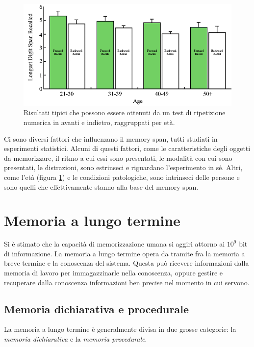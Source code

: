 \begin{figure}[hbt]
  \centering
  \includegraphics[width=\textwidth]{img/digit-span.png}
  \caption{Risultati tipici che possono essere ottenuti da un test di ripetizione numerica in avanti e indietro, raggruppati per età.}
  \label{fig:memory-span}
\end{figure}

Ci sono diversi fattori che influenzano il memory span, tutti studiati in esperimenti statistici. Alcuni di questi fattori, come le caratteristiche degli oggetti da memorizzare, il ritmo a cui essi sono presentati, le modalità con cui sono presentati, le distrazioni, sono estrinseci e riguardano l'esperimento in sé. Altri, come l'età (figura \ref{fig:memory-span}) e le condizioni patologiche, sono intrinseci delle persone e sono quelli che effettivamente stanno alla base del memory span.

\section{Memoria a lungo termine}
Si è stimato che la capacità di memorizzazione umana si aggiri attorno ai $10^9$ bit di informazione. La memoria a lungo termine opera da tramite fra la memoria a breve termine e la conoscenza del sistema. Questa può ricevere informazioni dalla memoria di lavoro per immagazzinarle nella conoscenza, oppure gestire e recuperare dalla conoscenza informazioni ben precise nel momento in cui servono.

\subsection{Memoria dichiarativa e procedurale}
La memoria a lungo termine è generalmente divisa in due grosse categorie: la \emph{memoria dichiarativa} e la \emph{memoria procedurale}.

